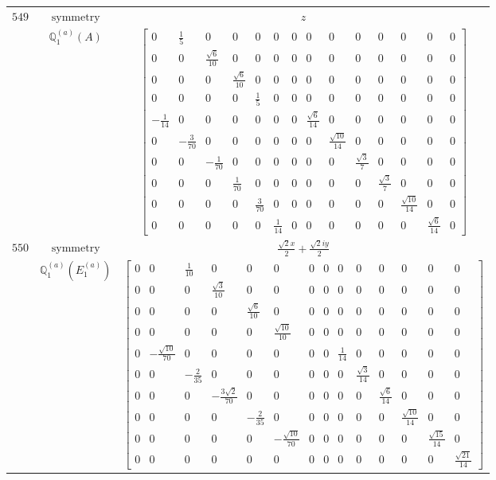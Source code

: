 \documentclass[fleqn,8pt,landscape]{jsarticle}
\begin{document}
\begin{longtable}{ccc}
$ 549 $ & $ \text{symmetry} $ & $ z $ \\
$  $ & $ \mathbb{Q}_{1}^{(a)}(A) $ & $ \begin{bmatrix} 0 & \frac{1}{5} & 0 & 0 & 0 & 0 & 0 & 0 & 0 & 0 & 0 & 0 & 0 & 0 \\ 0 & 0 & \frac{\sqrt{6}}{10} & 0 & 0 & 0 & 0 & 0 & 0 & 0 & 0 & 0 & 0 & 0 \\ 0 & 0 & 0 & \frac{\sqrt{6}}{10} & 0 & 0 & 0 & 0 & 0 & 0 & 0 & 0 & 0 & 0 \\ 0 & 0 & 0 & 0 & \frac{1}{5} & 0 & 0 & 0 & 0 & 0 & 0 & 0 & 0 & 0 \\ - \frac{1}{14} & 0 & 0 & 0 & 0 & 0 & 0 & \frac{\sqrt{6}}{14} & 0 & 0 & 0 & 0 & 0 & 0 \\ 0 & - \frac{3}{70} & 0 & 0 & 0 & 0 & 0 & 0 & \frac{\sqrt{10}}{14} & 0 & 0 & 0 & 0 & 0 \\ 0 & 0 & - \frac{1}{70} & 0 & 0 & 0 & 0 & 0 & 0 & \frac{\sqrt{3}}{7} & 0 & 0 & 0 & 0 \\ 0 & 0 & 0 & \frac{1}{70} & 0 & 0 & 0 & 0 & 0 & 0 & \frac{\sqrt{3}}{7} & 0 & 0 & 0 \\ 0 & 0 & 0 & 0 & \frac{3}{70} & 0 & 0 & 0 & 0 & 0 & 0 & \frac{\sqrt{10}}{14} & 0 & 0 \\ 0 & 0 & 0 & 0 & 0 & \frac{1}{14} & 0 & 0 & 0 & 0 & 0 & 0 & \frac{\sqrt{6}}{14} & 0 \end{bmatrix} $ \\ \hline
$ 550 $ & $ \text{symmetry} $ & $ \frac{\sqrt{2} x}{2} + \frac{\sqrt{2} i y}{2} $ \\
$  $ & $ \mathbb{Q}_{1}^{(a)}(E_{1}^{(a)}) $ & $ \begin{bmatrix} 0 & 0 & \frac{1}{10} & 0 & 0 & 0 & 0 & 0 & 0 & 0 & 0 & 0 & 0 & 0 \\ 0 & 0 & 0 & \frac{\sqrt{3}}{10} & 0 & 0 & 0 & 0 & 0 & 0 & 0 & 0 & 0 & 0 \\ 0 & 0 & 0 & 0 & \frac{\sqrt{6}}{10} & 0 & 0 & 0 & 0 & 0 & 0 & 0 & 0 & 0 \\ 0 & 0 & 0 & 0 & 0 & \frac{\sqrt{10}}{10} & 0 & 0 & 0 & 0 & 0 & 0 & 0 & 0 \\ 0 & - \frac{\sqrt{10}}{70} & 0 & 0 & 0 & 0 & 0 & 0 & \frac{1}{14} & 0 & 0 & 0 & 0 & 0 \\ 0 & 0 & - \frac{2}{35} & 0 & 0 & 0 & 0 & 0 & 0 & \frac{\sqrt{3}}{14} & 0 & 0 & 0 & 0 \\ 0 & 0 & 0 & - \frac{3 \sqrt{2}}{70} & 0 & 0 & 0 & 0 & 0 & 0 & \frac{\sqrt{6}}{14} & 0 & 0 & 0 \\ 0 & 0 & 0 & 0 & - \frac{2}{35} & 0 & 0 & 0 & 0 & 0 & 0 & \frac{\sqrt{10}}{14} & 0 & 0 \\ 0 & 0 & 0 & 0 & 0 & - \frac{\sqrt{10}}{70} & 0 & 0 & 0 & 0 & 0 & 0 & \frac{\sqrt{15}}{14} & 0 \\ 0 & 0 & 0 & 0 & 0 & 0 & 0 & 0 & 0 & 0 & 0 & 0 & 0 & \frac{\sqrt{21}}{14} \end{bmatrix} $ \\ \hline

\end{longtable}
\end{document}
